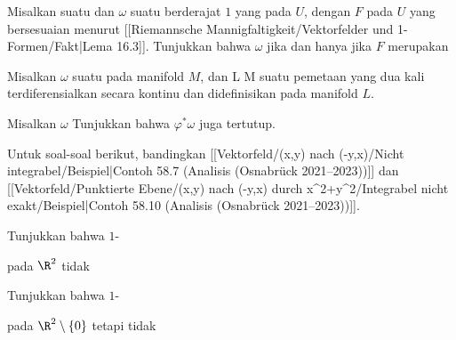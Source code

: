 {}
{

Misalkan
 suatu
dan $\omega$ suatu
 berderajat $1$ yang
pada $U$, dengan
$F$ pada $U$ yang bersesuaian menurut
[[Riemannsche Mannigfaltigkeit/Vektorfelder und 1-Formen/Fakt|Lema 16.3]].
Tunjukkan bahwa $\omega$
jika dan hanya jika $F$ merupakan

}
{} {}

{}
{

Misalkan $\omega$ suatu
 
pada manifold $M$, dan
\maabb {\varphi} { L } { M
} {}
suatu pemetaan yang dua kali terdiferensialkan secara kontinu dan didefinisikan pada manifold $L$.

 {Misalkan $\omega$
Tunjukkan bahwa
$\varphi^*\omega$ juga tertutup.
}

}
{} {}

Untuk soal-soal berikut, bandingkan
[[Vektorfeld/(x,y) nach (-y,x)/Nicht integrabel/Beispiel|Contoh 58.7 (Analisis (Osnabrück 2021–2023))]]
dan
[[Vektorfeld/Punktierte Ebene/(x,y) nach (-y,x) durch x^2+y^2/Integrabel nicht exakt/Beispiel|Contoh 58.10 (Analisis (Osnabrück 2021–2023))]].

{}
{

Tunjukkan bahwa
$1$-

 {  }

pada $\R^2$ tidak

}
{} {}

{}
{

Tunjukkan bahwa
$1$-

 {  }

pada $\R^2 \setminus \{0\}$
tetapi tidak

}
{} {}

